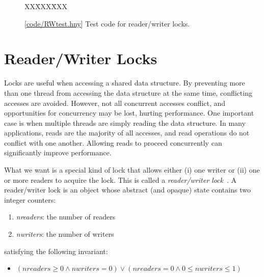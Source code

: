 \documentclass{report}
\newcommand{\harmonysource}[1]{
\begin{tabbing}
XX\=XXX\=XXX\kill
    
\end{tabbing}
}
\newcommand{\harmonylink}[1]{%
[\href{https://harmony.cs.cornell.edu/#1}{\underline{#1}}]%
}
\newenvironment{code}{
\tcolorbox
}{
\endtcolorbox
}
\begin{document}
\begin{figure}
\begin{code}
\harmonysource{RWtest}
\end{code}
\caption{\harmonylink{code/RWtest.hny} Test code for reader/writer locks.}
\label{fig:rwtest}
\end{figure}

\section{Reader/Writer Locks}
%
%

Locks are useful when accessing a shared data structure.  By preventing
more than one thread from accessing the data structure at the same
time, conflicting accesses are avoided.  However, not all concurrent
accesses conflict, and opportunities for concurrency may be lost,
hurting performance.  One important case is when multiple threads
are simply reading the data structure.
In many applications, reads are the majority of all accesses,
and read operations do not conflict with one another.
Allowing reads to proceed concurrently can significantly improve performance.

What we want is a special kind of lock that allows either (i) one writer
or (ii) one or more readers to acquire the lock.  This is called
a \emph{reader/writer lock}~\cite{CHP71}.
%
A reader/writer lock is an object whose abstract (and opaque)
state contains two integer counters:
\begin{enumerate}
\item \textit{nreaders}: the number of readers
\item \textit{nwriters}: the number of writers
\end{enumerate}
satisfying the following invariant:
\begin{itemize}
\item [] $(\mathit{nreaders} \ge 0 \land \mathit{nwriters} = 0) \lor
    (\mathit{nreaders} = 0 \land 0 \le \mathit{nwriters} \le 1)$
\end{itemize}
\end{document}
